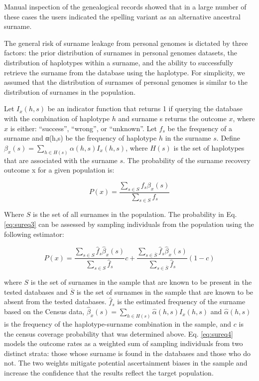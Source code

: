 Manual inspection of the genealogical records showed that in a large number of these cases the users indicated the spelling variant as an alternative ancestral surname.

The general risk of surname leakage from personal genomes is dictated by three factors: the prior distribution of surnames in personal genomes datasets, the distribution of haplotypes within a surname, and the ability to successfully retrieve the surname from the database using the haplotype. For simplicity, we assumed that the distribution of surnames of personal genomes is similar to the distribution of surnames in the population. 

Let $I_x(h,s)$ be an indicator function that returns 1 if querying the database with the combination of haplotype $h$ and surname s returns the outcome $x$, where $x$ is either: ``success'', ``wrong'', or ``unknown''. Let $f_s$ be the frequency of a surname and α(h,s) be the frequency of haplotype $h$ in the surname $s$. Define $\beta_x(s) = \sum_{h \in H(s)} \alpha(h,s)I_x(h,s)$, where $H(s)$ is the set of haplotypes that are associated with the surname $s$. The probability of the surname recovery outcome x for a given population is:

\begin{equation}
\label{eq:sureq3}
P(x) = \frac
{\sum_{s \in S} f_s \beta_x(s)}
{\sum_{s \in S} f_s}
\end{equation}

Where $S$ is the set of all surnames in the population. The probability in Eq. \ref{eq:sureq3} can be assessed by sampling individuals from the population using the following estimator:

\begin{equation}
\label{eq:sureq4}
P(x) = 
\frac{\sum_{s \in S} \hat{f}_s \hat{\beta}_x(s)}
{\sum_{s \in S}\hat{f}_s}c + 
\frac{\sum_{s \in \overline{S}} \hat{f}_s\hat{\beta}_x(s)}
{\sum_{s \in \overline{S}} \hat{f}_s} (1-c)
\end{equation}

where $S$ is the set of surnames in the sample that are known to be present in the tested databases and $\overline{S}$ is the set of surnames in the sample that are known to be absent from the tested databases. $\hat{f}_s$ is the estimated frequency of the surname based on the Census data, $\hat{\beta}_x(s) = \sum_{h \in H(s)} \hat{\alpha}(h,s)I_x(h,s)$ and $\hat{\alpha}(h,s)$  is the frequency of the haplotype-surname combination in the sample, and $c$ is the census coverage probability that was determined above. Eq. \ref{eq:sureq4} models the outcome rates as a weighted sum of sampling individuals from two distinct strata: those whose surname is found in the databases and those who do not. The two weights mitigate potential ascertainment biases in the sample and increase the confidence that the results reflect the target population.

